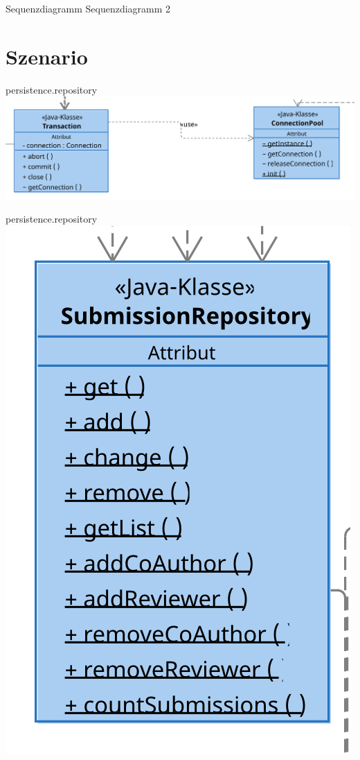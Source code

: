 \documentclass{beamer}
\begin{document}
    \begin{frame}{Sequenzdiagramm}
        \centering
        Sequenzdiagramm 2
    \end{frame}

    \section{Szenario}
    \begin{frame}{persistence.repository}
        \centering
        \includegraphics[width=\textwidth]{excerpts/Transaction+ConnectionPool@3x}
    \end{frame}

    \begin{frame}{persistence.repository}
        \centering
        \includegraphics[height=0.9\textheight]{excerpts/SubmissionRepository@3x}
    \end{frame}
\end{document}

